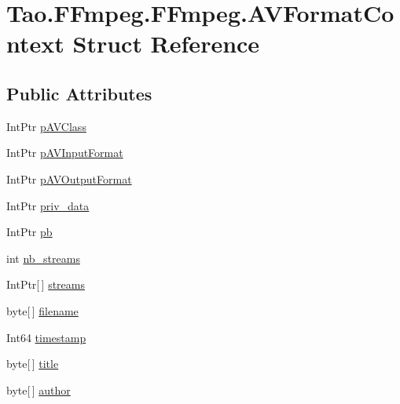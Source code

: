 \hypertarget{struct_tao_1_1_f_fmpeg_1_1_f_fmpeg_1_1_a_v_format_context}{
\section{Tao.FFmpeg.FFmpeg.AVFormatContext Struct Reference}
\label{struct_tao_1_1_f_fmpeg_1_1_f_fmpeg_1_1_a_v_format_context}
}
\subsection*{Public Attributes}
\begin{DoxyCompactItemize}
\item 
IntPtr \hyperlink{struct_tao_1_1_f_fmpeg_1_1_f_fmpeg_1_1_a_v_format_context_affd28f042c175ee86a2e6a90859d8b7c}{pAVClass}
\item 
IntPtr \hyperlink{struct_tao_1_1_f_fmpeg_1_1_f_fmpeg_1_1_a_v_format_context_a02beadf0f558399d6c4305e6a6edb67e}{pAVInputFormat}
\item 
IntPtr \hyperlink{struct_tao_1_1_f_fmpeg_1_1_f_fmpeg_1_1_a_v_format_context_a7de22606c2cf4386c949a5d552dddf21}{pAVOutputFormat}
\item 
IntPtr \hyperlink{struct_tao_1_1_f_fmpeg_1_1_f_fmpeg_1_1_a_v_format_context_a75aae4f8e74b800877a351469205bdd7}{priv\_\-data}
\item 
IntPtr \hyperlink{struct_tao_1_1_f_fmpeg_1_1_f_fmpeg_1_1_a_v_format_context_a07f972c65a57fb4a4a15c5a9a5ec5684}{pb}
\item 
int \hyperlink{struct_tao_1_1_f_fmpeg_1_1_f_fmpeg_1_1_a_v_format_context_a1efcf27d1812839fc8ee9970f0ca36c7}{nb\_\-streams}
\item 
IntPtr\mbox{[}$\,$\mbox{]} \hyperlink{struct_tao_1_1_f_fmpeg_1_1_f_fmpeg_1_1_a_v_format_context_a940f19950683d07281e6dc8b9cd54c2f}{streams}
\item 
byte\mbox{[}$\,$\mbox{]} \hyperlink{struct_tao_1_1_f_fmpeg_1_1_f_fmpeg_1_1_a_v_format_context_aeea3d27ac0d49c67704100b8d22d5686}{filename}
\item 
Int64 \hyperlink{struct_tao_1_1_f_fmpeg_1_1_f_fmpeg_1_1_a_v_format_context_a9329ebe2fa2284579e147e100023f335}{timestamp}
\item 
byte\mbox{[}$\,$\mbox{]} \hyperlink{struct_tao_1_1_f_fmpeg_1_1_f_fmpeg_1_1_a_v_format_context_a2525317ca2cfe049e28a8c8a12d4cdfa}{title}
\item 
byte\mbox{[}$\,$\mbox{]} \hyperlink{struct_tao_1_1_f_fmpeg_1_1_f_fmpeg_1_1_a_v_format_context_a3e48cbde311d11cddf8477f52559d776}{author}

\end{DoxyCompactItemize}

